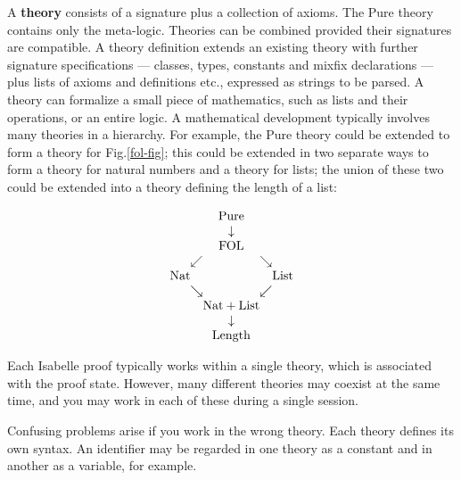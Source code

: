  A {\bf theory} consists of a signature plus a collection
of axioms. The Pure theory contains only the meta-logic. Theories can be
combined provided their signatures are compatible. A theory definition
extends an existing theory with further signature specifications --- classes,
types, constants and mixfix declarations --- plus lists of axioms and
definitions etc., expressed as strings to be parsed. A theory can formalize a
small piece of mathematics, such as lists and their operations, or an entire
logic. A mathematical development typically involves many theories in a
hierarchy. For example, the Pure theory could be extended to form a theory
for Fig.\ts\ref{fol-fig}; this could be extended in two separate ways to form
a theory for natural numbers and a theory for lists; the union of these two
could be extended into a theory defining the length of a list:
\begin{tt}
    \[
        \begin{array}{c@{}c@{}c@{}c@{}c}
        {}
            &     {}   &\hbox{Pure}&     {}  &     {}  \\
            {}   &     {}   &  \downarrow &     {}   &     {}   \\
            {}   &     {}   &\hbox{FOL} &     {}   &     {}   \\
            {}   & \swarrow &     {}    & \searrow &     {}   \\
            \hbox{Nat} &   {}   &     {}    &     {}   & \hbox{List} \\
            {}   & \searrow &     {}    & \swarrow &     {}   \\
            {}   &     {} &\hbox{Nat}+\hbox{List}&  {}   &     {}   \\
            {}   &     {}   &  \downarrow &     {}   &     {}   \\
            {}   &     {} & \hbox{Length} &  {}   &     {}
        \end{array}
    \]
\end{tt}%
Each Isabelle proof typically works within a single theory, which is
associated with the proof state. However, many different theories may
coexist at the same time, and you may work in each of these during a single
session.

\begin{warn}
    Confusing problems arise if you work in the wrong theory. Each theory
    defines its own syntax. An identifier may be regarded in one theory as a
    constant and in another as a variable, for example.
\end{warn}


